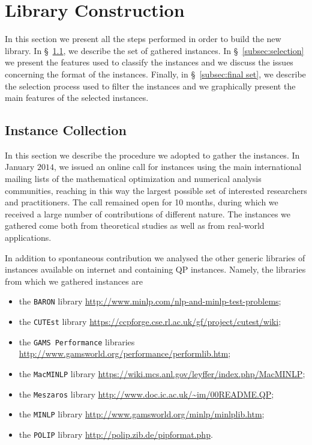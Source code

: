 \section{Library Construction}\label{sec:lib}

In this section we present all the steps performed in order to build the
new library. In \S~\ref{subsec:instColl}, we describe the set of gathered
instances. In \S~\ref{subsec:selection} we present the features used to
classify the instances and we discuss the issues concerning the format of
the instances. Finally, in \S~\ref{subsec:final set}, we describe the
selection process used to filter the instances and we graphically present
the main features of the selected instances.

\subsection{Instance Collection}\label{subsec:instColl}

In this section we describe the procedure we adopted to gather the
instances. In January $2014$, we issued an online call for instances
using the main international mailing lists of the mathematical
optimization and numerical analysis communities, reaching in this way
the largest possible set of interested researchers and practitioners.
The call remained open for 10 months, during which we received a large
number of contributions of different nature. The instances we gathered
come both from theoretical studies as well as from real-world
applications.

In addition to spontaneous contribution we analysed the other generic
libraries of instances available  on internet and containing QP
instances. Namely, the libraries from which we gathered instances are
%
\begin{itemize}
 \item the {\tt BARON} library
 \url{http://www.minlp.com/nlp-and-minlp-test-problems};
%
\item the {\tt CUTEst} library
 \url{https://ccpforge.cse.rl.ac.uk/gf/project/cutest/wiki};
%
\item the {\tt GAMS Performance} libraries
 \url{http://www.gamsworld.org/performance/performlib.htm};
%
\item the {\tt MacMINLP} library
 \url{https://wiki.mcs.anl.gov/leyffer/index.php/MacMINLP};
%
\item the {\tt Meszaros} library
 \url{http://www.doc.ic.ac.uk/~im/00README.QP};
%
\item the {\tt MINLP} library
 \url{http://www.gamsworld.org/minlp/minlplib.htm};
%
\item the {\tt POLIP} library
 \url{http://polip.zib.de/pipformat.php}.
\end{itemize}

